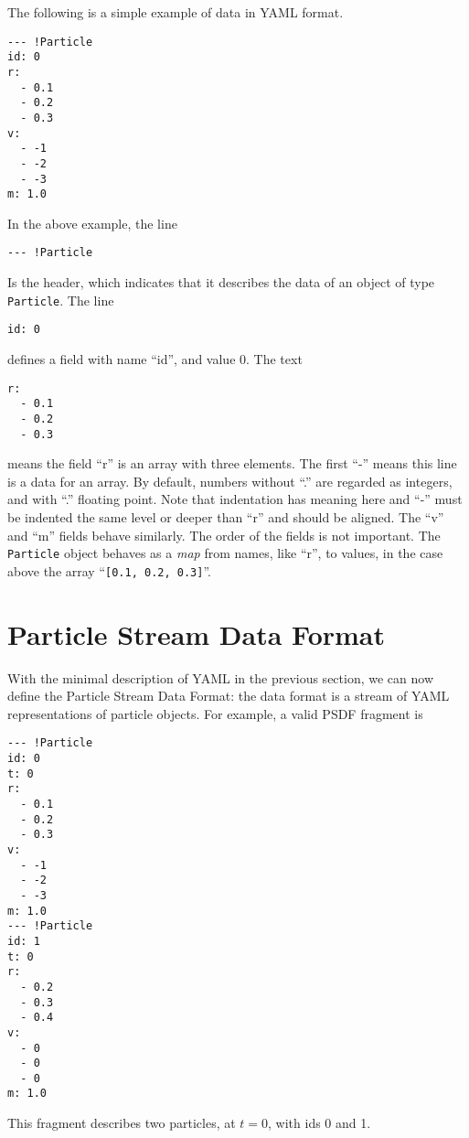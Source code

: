\documentclass[5p,authoryear]{elsarticle}
\begin{document}
The following is a simple example of data in YAML format.
\begin{verbatim}
--- !Particle
id: 0
r:
  - 0.1
  - 0.2
  - 0.3
v:
  - -1
  - -2
  - -3
m: 1.0
\end{verbatim}
In the above example, the line
\begin{verbatim}
--- !Particle
\end{verbatim}
Is the header, which indicates that it describes the data of an object
of type {\tt Particle}.  The line
\begin{verbatim}
id: 0
\end{verbatim}
defines a field with name ``id'', and value 0.  The text
\begin{verbatim}
r:
  - 0.1
  - 0.2
  - 0.3
\end{verbatim}
means the field ``r'' is an array with three elements. The first ``-''
means this line is a data for an array.  By default, numbers without
``.'' are regarded as integers, and with ``.'' floating point. Note
that indentation has meaning here and ``-'' must be indented the same
level or deeper than ``r'' and should be aligned.  The ``v'' and ``m''
fields behave similarly.  The order of the fields is not important.
The {\tt Particle} object behaves as a \emph{map} from names, like
``r'', to values, in the case above the array ``\verb|[0.1, 0.2, 0.3]|''.

\section{Particle Stream Data Format}

With the minimal description of YAML in the previous section, we can
now define the Particle Stream Data Format: the data format is a
stream of YAML representations of particle objects.  For example, a
valid PSDF fragment is
\begin{verbatim}
--- !Particle
id: 0
t: 0
r:
  - 0.1
  - 0.2
  - 0.3
v:
  - -1
  - -2
  - -3
m: 1.0
--- !Particle
id: 1
t: 0
r:
  - 0.2
  - 0.3
  - 0.4
v:
  - 0
  - 0
  - 0
m: 1.0
\end{verbatim}
This fragment describes two particles, at $t = 0$, with ids 0 and 1.
\end{document}
